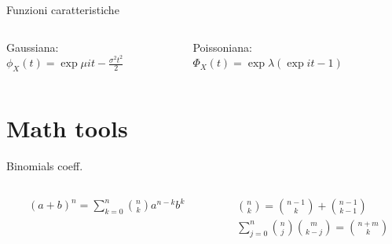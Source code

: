 \documentclass[asd-beamer.tex]{subfiles}%
\begin{document}

\begin{wordonframe}{Funzioni caratteristiche}
\begin{columns}[T]
	\begin{column}{0.5\textwidth}
Gaussiana: $\phi_X(t)=\exp{\mu it-\frac{\sigma^2t^2}{2}}$
	\end{column}
	\begin{column}{0.5\textwidth}
Poissoniana: $\Phi_X(t)=\exp{\lambda(\exp{it}-1)}$
	\end{column}
\end{columns}
\end{wordonframe}

\section{Math tools}

\begin{wordonframe}{Binomials coeff.}\frameintoc
	\begin{columns}[T]
\begin{column}{0.5\textwidth}
\begin{align*}
&(a+b)^n=\sum_{k=0}^n\binom{n}{k}a^{n-k}b^k
\end{align*}
\end{column}
\begin{column}{0.5\textwidth}
\begin{align*}
&\binom{n}{k}=\binom{n-1}{k}+\binom{n-1}{k-1}\\
&\sum_{j=0}^n\binom{n}{j}\binom{m}{k-j}=\binom{n+m}{k}
\end{align*}
\end{column}
	\end{columns}
\end{wordonframe}
\end{document}
